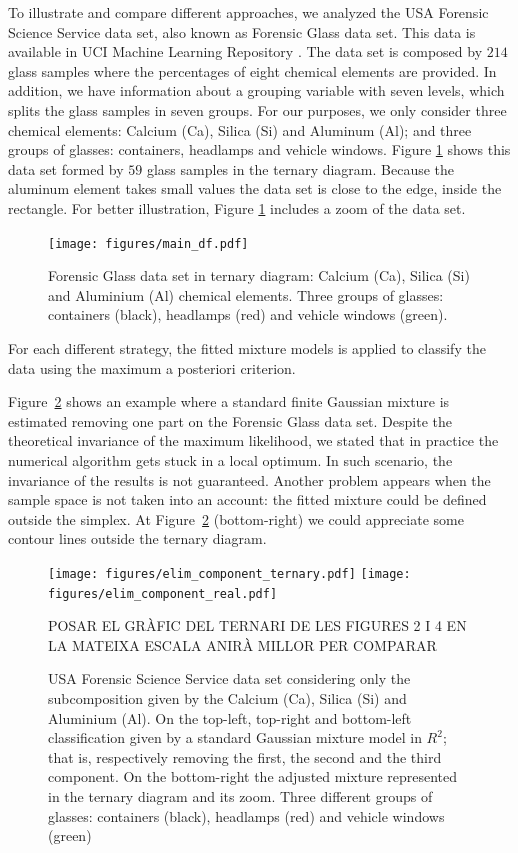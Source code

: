\documentclass[preprint, review, 3p, authoryear]{elsarticle}
\begin{document}
\noindent To illustrate and compare different approaches, we analyzed the USA Forensic Science Service data set, also known as Forensic Glass data set. This data is available in UCI Machine Learning Repository \cite{Bache+Lichman:2013}.  The data set is composed by  $214$ glass samples where the percentages of eight chemical elements are provided. In addition, we have information about a grouping variable with seven levels, which splits the glass samples in seven groups. For our purposes, we only consider three chemical elements: Calcium (Ca), Silica (Si) and Aluminum (Al); and three groups of glasses: containers, headlamps and vehicle windows. Figure \ref{fig04} shows this data set formed by $59$ glass samples in the ternary diagram. Because the aluminum element takes small values the data set is close to the edge, inside the rectangle. For better illustration, Figure \ref{fig04} includes a zoom of the data set.


\begin{figure}[htbp]
\centering
\texttt{[image: figures/main\_df.pdf]}%
\caption{Forensic Glass data set in ternary diagram: Calcium (Ca), Silica (Si) and Aluminium (Al) chemical elements. Three groups of glasses: containers (black), headlamps (red) and vehicle windows (green).}
\label{fig04}
\end{figure}

For each different strategy, the fitted mixture models is applied to classify the data using the maximum a posteriori criterion.

Figure~\ref{fig05component_elimination} shows an example where a standard finite Gaussian mixture is estimated removing one part on the Forensic Glass data set. Despite the theoretical invariance of the maximum likelihood, we stated that in practice the numerical algorithm gets stuck in a local optimum. In such scenario, the invariance of the results is not guaranteed. Another problem appears when the sample space is not taken into an account: the fitted mixture could be defined outside the simplex. At Figure~\ref{fig05component_elimination} (bottom-right) we could appreciate some contour lines outside the ternary diagram.

\begin{figure}[htbp]
\centering
\texttt{[image: figures/elim\_component\_ternary.pdf]}
\texttt{[image: figures/elim\_component\_real.pdf]}



\caption{USA Forensic Science Service data set considering only the subcomposition given by the Calcium (Ca), Silica (Si) and Aluminium (Al). On the top-left, top-right and bottom-left classification given by a standard Gaussian mixture model in $R^{2}$; that is, respectively removing the first, the second and the third component. On the bottom-right the adjusted mixture represented in the ternary diagram and its zoom. Three different groups of glasses: containers (black), headlamps (red) and vehicle windows (green)} POSAR EL GR\`{A}FIC DEL TERNARI DE LES FIGURES 2 I 4 EN LA MATEIXA ESCALA ANIR\`{A} MILLOR PER COMPARAR
\label{fig05component_elimination}
\end{figure}
\end{document}
